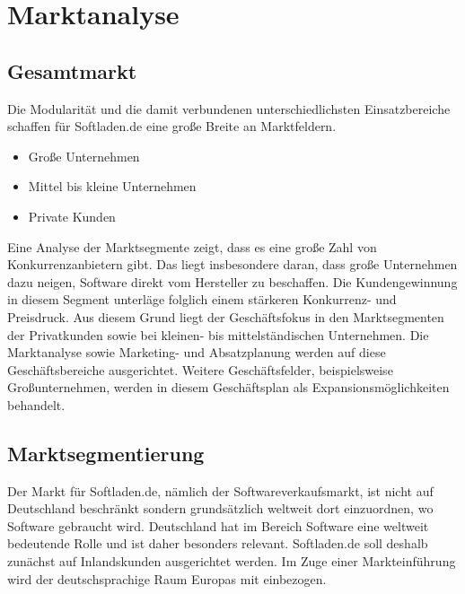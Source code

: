 \chapter{Marktanalyse}
\section{Gesamtmarkt}
Die Modularität und die damit verbundenen unterschiedlichsten Einsatzbereiche schaffen
für Softladen.de eine große Breite an Marktfeldern.
\begin{itemize}
	\item Große Unternehmen
	\item Mittel bis kleine Unternehmen
	\item Private Kunden
\end{itemize}
Eine Analyse der Marktsegmente zeigt, dass es eine große Zahl von Konkurrenzanbietern gibt. Das liegt insbesondere daran, dass große Unternehmen dazu neigen, Software direkt vom Hersteller zu beschaffen. Die Kundengewinnung in diesem Segment unterläge folglich einem stärkeren Konkurrenz- und Preisdruck. Aus diesem Grund liegt der Geschäftsfokus in den Marktsegmenten der Privatkunden sowie bei kleinen- bis mittelständischen Unternehmen. Die Marktanalyse sowie Marketing- und Absatzplanung werden auf diese Geschäftsbereiche ausgerichtet. Weitere Geschäftsfelder, beispielsweise Großunternehmen, werden in diesem Geschäftsplan als Expansionsmöglichkeiten behandelt.
\section{Marktsegmentierung}
Der Markt für Softladen.de, nämlich der Softwareverkaufsmarkt, ist nicht auf Deutschland beschränkt sondern grundsätzlich weltweit dort einzuordnen, wo Software gebraucht wird. Deutschland hat im Bereich Software eine weltweit bedeutende Rolle und ist daher besonders relevant. Softladen.de soll deshalb zunächst auf Inlandskunden ausgerichtet werden. Im Zuge einer Markteinführung wird der deutschsprachige Raum Europas mit einbezogen. 

